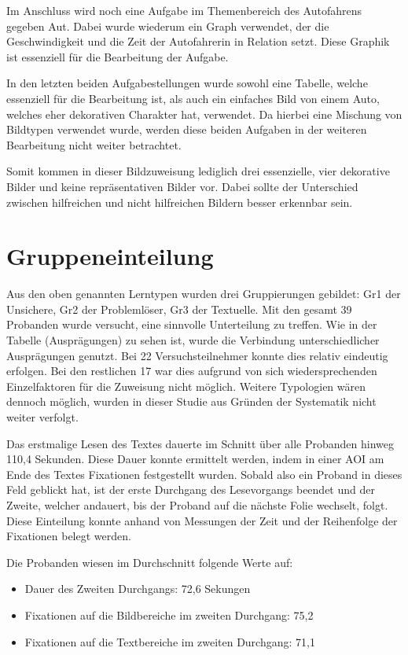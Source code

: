 Im Anschluss wird noch eine Aufgabe im Themenbereich des Autofahrens gegeben \gls{Aut}. Dabei wurde wiederum ein Graph verwendet, der die Geschwindigkeit und die Zeit der Autofahrerin in Relation setzt. Diese Graphik ist essenziell für die Bearbeitung der Aufgabe. 


In den letzten beiden Aufgabestellungen wurde sowohl eine Tabelle, welche essenziell für die Bearbeitung ist, als auch ein einfaches Bild von einem Auto, welches eher dekorativen Charakter hat, verwendet. Da hierbei eine Mischung von Bildtypen verwendet wurde, werden diese beiden Aufgaben in der weiteren Bearbeitung nicht weiter betrachtet. 

Somit kommen in dieser Bildzuweisung lediglich drei essenzielle, vier dekorative Bilder und keine repräsentativen Bilder vor. Dabei sollte der Unterschied zwischen hilfreichen und nicht hilfreichen Bildern besser erkennbar sein.


\section{Gruppeneinteilung}

Aus den oben genannten Lerntypen wurden drei Gruppierungen gebildet: \gls{Gr1} der Unsichere, \gls{Gr2} der Problemlöser, \gls{Gr3} der Textuelle. Mit den gesamt 39 Probanden wurde versucht, eine sinnvolle Unterteilung zu treffen. Wie in der Tabelle (Ausprägungen) zu sehen ist, wurde die Verbindung unterschiedlicher Ausprägungen genutzt. Bei 22 Versuchsteilnehmer konnte dies relativ eindeutig erfolgen. Bei den restlichen 17 war dies aufgrund von sich wiedersprechenden Einzelfaktoren für die Zuweisung nicht möglich. Weitere Typologien wären dennoch möglich, wurden in dieser Studie aus Gründen der Systematik nicht weiter verfolgt.

Das erstmalige Lesen des Textes dauerte im Schnitt über alle Probanden hinweg 110,4 Sekunden. Diese Dauer konnte ermittelt werden, indem in einer AOI am Ende des Textes Fixationen festgestellt wurden. Sobald also ein Proband in dieses Feld geblickt hat, ist der erste Durchgang des Lesevorgangs beendet und der Zweite, welcher andauert, bis der Proband auf die nächste Folie wechselt, folgt. Diese Einteilung konnte anhand von Messungen der Zeit und der Reihenfolge der Fixationen belegt werden. 


Die Probanden wiesen im Durchschnitt folgende Werte auf:
    \begin{itemize}
        \item Dauer des Zweiten Durchgangs: 72,6 Sekungen 
        \item Fixationen auf die Bildbereiche im zweiten Durchgang: 75,2
        \item Fixationen auf die Textbereiche im zweiten Durchgang: 71,1
    \end{itemize}

